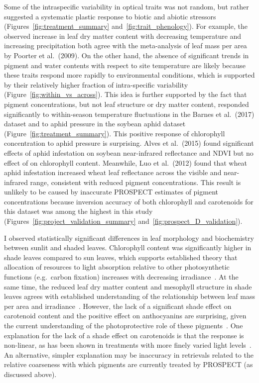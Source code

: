 Some of the intraspecific variability in optical traits was not random, but rather suggested a systematic plastic response to biotic and abiotic stressors (Figures~\ref{fig:treatment_summary} and~\ref{fig:trait_phenology}).
For example, the observed increase in leaf dry matter content with decreasing temperature and increasing precipitation both agree with the meta-analysis of leaf mass per area by Poorter et al.~(2009). \nocite{poorter_2009_causes}
On the other hand, the absence of significant trends in pigment and water contents with respect to site temperature are likely because these traits respond more rapidly to environmental conditions, which is supported by their relatively higher fraction of intra-specific variability (Figure~\ref{fig:within_vs_across}).
This idea is further supported by the fact that pigment concentrations, but not leaf structure or dry matter content, responded significantly to within-season temperature fluctuations in the Barnes et al.~(2017) \nocite{barnes_2017_beyond} dataset and to aphid pressure in the soybean aphid dataset (Figure~\ref{fig:treatment_summary}).
This positive response of chlorophyll concentration to aphid pressure is surprising.
Alves et al.~(2015) \nocite{alves_2015_soybean} found significant effects of aphid infestation on soybean near-infrared reflectance and NDVI but no effect of on chlorophyll content.
Meanwhile, Luo et al.~(2012) \nocite{luo_2012_evaluation} found that wheat aphid infestation increased wheat leaf reflectance across the visible and near-infrared range, consistent with reduced pigment concentrations.
This result is unlikely to be caused by inaccurate PROSPECT estimates of pigment concentrations because inversion accuracy of both chlorophyll and carotenoids for this dataset was among the highest in this study (Figures~\ref{fig:project_validation_summary} and~\ref{fig:prospect_D_validation}).

I observed statistically significant differences in leaf morphology and biochemistry between sunlit and shaded leaves.
Chlorophyll content was significantly higher in shade leaves compared to sun leaves, which supports established theory that allocation of resources to light absorption relative to other photosynthetic functions (e.g.\ carbon fixation) increases with decreasing irradiance~\cite{hikosaka_1995_model}.
At the same time, the reduced leaf dry matter content and mesophyll structure in shade leaves agrees with established understanding of the relationship between leaf mass per area and irradiance~\cite{poorter_2009_causes}.
However, the lack of a significant shade effect on carotenoid content and the positive effect on anthocyanins are surprising, given the current understanding of the photoprotective role of these pigments~\cite{young_1991_photoprotective,steyn_2002_anthocyanins}.
One explanation for the lack of a shade effect on carotenoids is that the response is non-linear, as has been shown in treatments with more finely varied light levels~\cite{sonobe_2017_estimating}.
An alternative, simpler explanation may be inaccuracy in retrievals related to the relative coarseness with which pigments are currently treated by PROSPECT (as discussed above).

